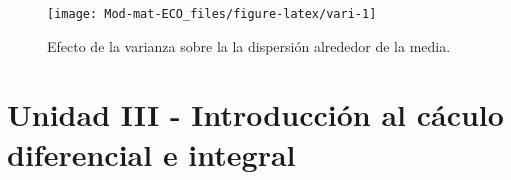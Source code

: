 \documentclass[
]{book}
\begin{document}
\begin{figure}

{\centering \texttt{[image: Mod-mat-ECO\_files/figure-latex/vari-1]} 

}

\caption{Efecto de  la varianza sobre la la dispersión alrededor de la media.}\label{fig:vari}
\end{figure}

\hypertarget{unidad-iii---introducciuxf3n-al-cuxe1culo-diferencial-e-integral}{%
\chapter{Unidad III - Introducción al cáculo diferencial e integral}\label{unidad-iii---introducciuxf3n-al-cuxe1culo-diferencial-e-integral}}

  
\end{document}
